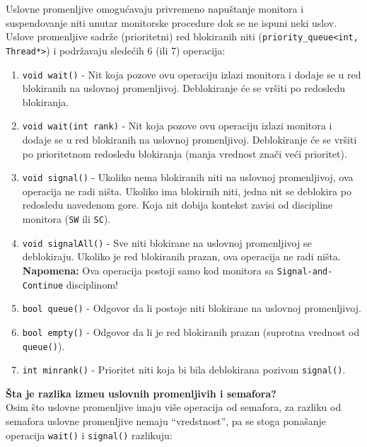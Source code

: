 Uslovne promenljive omogu\'{c}avaju privremeno napu\v{s}tanje monitora i suspendovanje niti unutar monitorske procedure dok se ne ispuni neki uslov. Uslove promenljive sadr\v{z}e (prioritetni) red blokiranih niti (\texttt{priority\_queue<int, Thread*>}) i podr\v{z}avaju slede\'{c}ih 6 (ili 7) operacija:
\begin{enumerate}
    \item \texttt{void wait()} - Nit koja pozove ovu operaciju izlazi monitora i dodaje se u red blokiranih na uslovnoj promenljivoj. Deblokiranje \'{c}e se vr\v{s}iti po  redosledu blokiranja. 
    \item \texttt{void wait(int rank)} - Nit koja pozove ovu operaciju izlazi monitora i dodaje se u red blokiranih na uslovnoj promenljivoj. Deblokiranje \'{c}e se vr\v{s}iti po prioritetnom redosledu blokiranja (manja vrednost zna\v{c}i ve\'{c}i prioritet).
    \item \texttt{void signal()} - Ukoliko nema blokiranih niti na uslovnoj promenljivoj, ova operacija ne radi ni\v{s}ta. Ukoliko ima blokirnih niti, jedna nit se deblokira po redosledu navedenom gore. Koja nit dobija kontekst zavisi od discipline monitora (\texttt{SW} ili \texttt{SC}).
    \item \texttt{void signalAll()} - Sve niti blokirane na uslovnoj promenljivoj se deblokiraju. Ukoliko je red blokiranih prazan, ova operacija ne radi ni\v{s}ta. \textbf{Napomena:} Ova operacija postoji samo kod monitora sa \texttt{Signal-and-Continue} disciplinom!
    \item \texttt{bool queue()} - Odgovor da li postoje niti blokirane na uslovnoj promenljivoj.
    \item \texttt{bool empty()} - Odgovor da li je red blokiranih prazan (suprotna vrednost od \texttt{queue()}).
    \item \texttt{int minrank()} - Prioritet niti koja bi bila deblokirana pozivom \texttt{signal()}.
\end{enumerate}
\textbf{\v{S}ta je razlika izme\dj{}u uslovnih promenljivih i semafora?}\\
 Osim  \v{s}to uslovne promenljive imaju vi\v{s}e operacija od semafora, za razliku od semafora uslovne promenljive nemaju ``vredstnost'', pa se stoga pona\v{s}anje operacija \texttt{wait()} i \texttt{signal()}  razlikuju:
